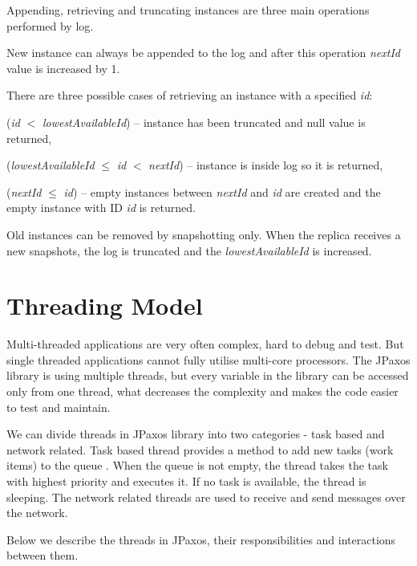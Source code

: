 Appending, retrieving and truncating instances are three main operations per\-for\-med by log.

New instance can always be appended to the log and after this operation \textit{nextId} value is increased by 1. 

\noindent There are three possible cases of retrieving an instance with a specified \textit{id}:
\begin{tightList}
  \item[\textbullet] (\textit{id} $<$ \textit{lowestAvailableId}) -- instance has been truncated and null value is returned,
  \item[\textbullet] (\textit{lowestAvailableId} $\leq$ \textit{id} $<$ \textit{nextId}) -- instance is inside log so it is returned,
  \item[\textbullet] (\textit{nextId} $\leq$ \textit{id}) -- empty instances between \textit{nextId} and \textit{id} are created and the empty instance with ID \textit{id} is returned.
\end{tightList}

\noindent Old instances can be removed by snapshotting only. When the replica receives a new snapshots, the log is truncated and the \textit{lowestAvailableId} is increased.

\section{Threading Model}
\label{sec:threads}

Multi-threaded applications are very often complex, hard to debug and test. But single threaded applications cannot fully utilise multi-core processors. The JPaxos library is using multiple threads, but every variable in the library can be accessed only from one thread, what decreases the complexity and makes the code easier to test and maintain.

We can divide threads in JPaxos library into two categories - task based and
network related. 
Task based thread provides a method to add new tasks (work
items) to the queue . When the queue is not empty, the thread takes the task
with highest priority and executes it. If no task is available, the thread is
sleeping. The network related threads are used to receive and send messages
over the network.

Below we describe the threads in JPaxos, their responsibilities and interactions between them. 

